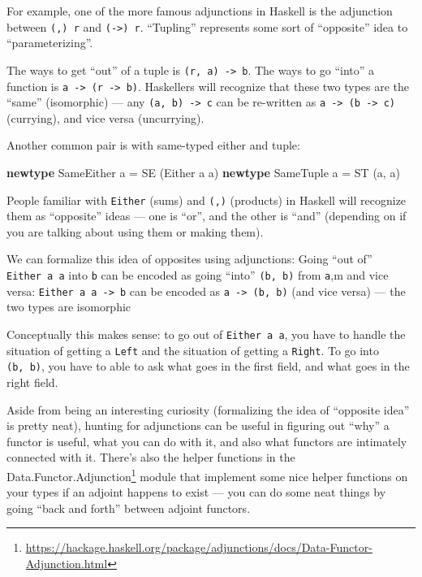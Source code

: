 \documentclass[]{article}
\newenvironment{Shaded}{}{}
\newcommand{\DataTypeTok}[1]{\textcolor[rgb]{0.56,0.13,0.00}{#1}}
\newcommand{\KeywordTok}[1]{\textcolor[rgb]{0.00,0.44,0.13}{\textbf{#1}}}
\newcommand{\NormalTok}[1]{#1}
\newcommand{\OtherTok}[1]{\textcolor[rgb]{0.00,0.44,0.13}{#1}}
\renewcommand{\href}[2]{#2\footnote{\url{#1}}}
\begin{document}
For example, one of the more famous adjunctions in Haskell is the adjunction
between \texttt{(,)\ r} and \texttt{(-\textgreater{})\ r}. ``Tupling''
represents some sort of ``opposite'' idea to ``parameterizing''.

The ways to get ``out'' of a tuple is \texttt{(r,\ a)\ -\textgreater{}\ b}. The
ways to go ``into'' a function is
\texttt{a\ -\textgreater{}\ (r\ -\textgreater{}\ b)}. Haskellers will recognize
that these two types are the ``same'' (isomorphic) --- any
\texttt{(a,\ b)\ -\textgreater{}\ c} can be re-written as
\texttt{a\ -\textgreater{}\ (b\ -\textgreater{}\ c)} (currying), and vice versa
(uncurrying).

Another common pair is with same-typed either and tuple:

\begin{Shaded}
\begin{Highlighting}[]
\KeywordTok{newtype} \DataTypeTok{SameEither}\NormalTok{ a }\OtherTok{=} \DataTypeTok{SE}\NormalTok{ (}\DataTypeTok{Either}\NormalTok{ a a)}
\KeywordTok{newtype} \DataTypeTok{SameTuple}\NormalTok{  a }\OtherTok{=} \DataTypeTok{ST}\NormalTok{ (a, a)}
\end{Highlighting}
\end{Shaded}

People familiar with \texttt{Either} (sums) and \texttt{(,)} (products) in
Haskell will recognize them as ``opposite'' ideas --- one is ``or'', and the
other is ``and'' (depending on if you are talking about using them or making
them).

We can formalize this idea of opposites using adjunctions: Going ``out of''
\texttt{Either\ a\ a} into \texttt{b} can be encoded as going ``into''
\texttt{(b,\ b)} from \texttt{a},m and vice versa:
\texttt{Either\ a\ a\ -\textgreater{}\ b} can be encoded as
\texttt{a\ -\textgreater{}\ (b,\ b)} (and vice versa) --- the two types are
isomorphic

Conceptually this makes sense: to go out of \texttt{Either\ a\ a}, you have to
handle the situation of getting a \texttt{Left} and the situation of getting a
\texttt{Right}. To go into \texttt{(b,\ b)}, you have to able to ask what goes
in the first field, and what goes in the right field.

Aside from being an interesting curiosity (formalizing the idea of ``opposite
idea'' is pretty neat), hunting for adjunctions can be useful in figuring out
``why'' a functor is useful, what you can do with it, and also what functors are
intimately connected with it. There's also the helper functions in the
\href{https://hackage.haskell.org/package/adjunctions/docs/Data-Functor-Adjunction.html}{Data.Functor.Adjunction}
module that implement some nice helper functions on your types if an adjoint
happens to exist --- you can do some neat things by going ``back and forth''
between adjoint functors.
\end{document}
